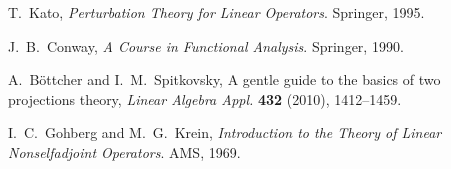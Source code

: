 \documentclass[11pt]{article}
\theoremstyle{definition}
\begin{document}
\begin{thebibliography}{9}

T.~Kato, \emph{Perturbation Theory for Linear Operators}. Springer, 1995.

J.~B.~Conway, \emph{A Course in Functional Analysis}. Springer, 1990.

A.~B\"{o}ttcher and I.~M.~Spitkovsky, A gentle guide to the basics of two projections theory,
\emph{Linear Algebra Appl.} \textbf{432} (2010), 1412--1459.

I.~C.~Gohberg and M.~G.~Krein, \emph{Introduction to the Theory of Linear Nonselfadjoint Operators}. AMS, 1969.

\end{thebibliography}
\end{document}
